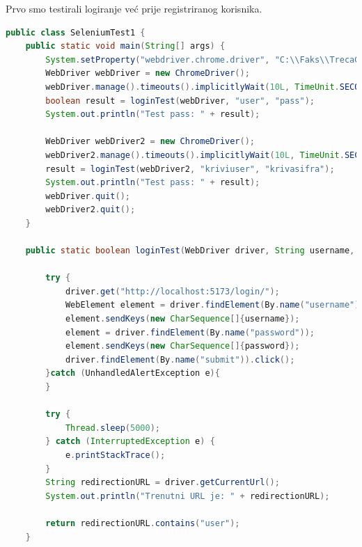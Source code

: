             Prvo smo testirali logiranje već prije registriranog korisnika.
           \begin{lstlisting}[language=Java, label=8st:java_example, basicstyle=\scriptsize, baselinestretch=0.9]
 public class SeleniumTest1 {
    public static void main(String[] args) {
        System.setProperty("webdriver.chrome.driver", "C:\\Faks\\TrecaGod\\PROGI\\Projekt\\chromedriver-win64\\chromedriver.exe");
        WebDriver webDriver = new ChromeDriver();
        webDriver.manage().timeouts().implicitlyWait(10L, TimeUnit.SECONDS);
        boolean result = loginTest(webDriver, "user", "pass");
        System.out.println("Test pass: " + result);

        WebDriver webDriver2 = new ChromeDriver();
        webDriver2.manage().timeouts().implicitlyWait(10L, TimeUnit.SECONDS);
        result = loginTest(webDriver2, "kriviuser", "krivasifra");
        System.out.println("Test pass: " + result);
        webDriver.quit();
        webDriver2.quit();
    }

    public static boolean loginTest(WebDriver driver, String username, String password){

        try {
            driver.get("http://localhost:5173/login/");
            WebElement element = driver.findElement(By.name("username"));
            element.sendKeys(new CharSequence[]{username});
            element = driver.findElement(By.name("password"));
            element.sendKeys(new CharSequence[]{password});
            driver.findElement(By.name("submit")).click();
        }catch (UnhandledAlertException e){
        }

        try {
            Thread.sleep(5000);
        } catch (InterruptedException e) {
            e.printStackTrace();
        }
        String redirectionURL = driver.getCurrentUrl();
        System.out.println("Trenutni URL je: " + redirectionURL);

        return redirectionURL.contains("user");
    }
\end{lstlisting}

